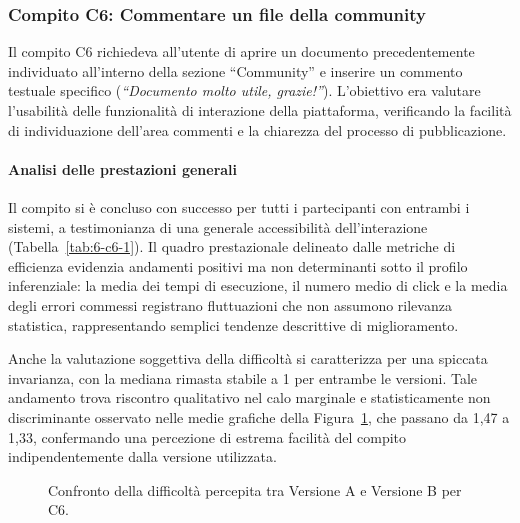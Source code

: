 \subsubsection{Compito C6: Commentare un file della community}

Il compito C6 richiedeva all’utente di aprire un documento precedentemente individuato all’interno della sezione ``Community'' e inserire un commento testuale specifico (\textit{``Documento molto utile, grazie!''}). L’obiettivo era valutare l’usabilità delle funzionalità di interazione della piattaforma, verificando la facilità di individuazione dell’area commenti e la chiarezza del processo di pubblicazione.

\paragraph{Analisi delle prestazioni generali}

Il compito si è concluso con successo per tutti i partecipanti con entrambi i sistemi, a testimonianza di una generale accessibilità dell'interazione (Tabella~\ref{tab:6-c6-1}). Il quadro prestazionale delineato dalle metriche di efficienza evidenzia andamenti positivi ma non determinanti sotto il profilo inferenziale: la media dei tempi di esecuzione, il numero medio di click e la media degli errori commessi registrano fluttuazioni che non assumono rilevanza statistica, rappresentando semplici tendenze descrittive di miglioramento.

Anche la valutazione soggettiva della difficoltà si caratterizza per una spiccata invarianza, con la mediana rimasta stabile a 1 per entrambe le versioni. Tale andamento trova riscontro qualitativo nel calo marginale e statisticamente non discriminante osservato nelle medie grafiche della Figura~\ref{fig:6-c6-1}, che passano da 1,47 a 1,33, confermando una percezione di estrema facilità del compito indipendentemente dalla versione utilizzata.

\begin{figure}[H]
	\centering
	\caption{Confronto della difficoltà percepita tra Versione A e Versione B per C6.}
	\label{fig:6-c6-1}
\end{figure}

